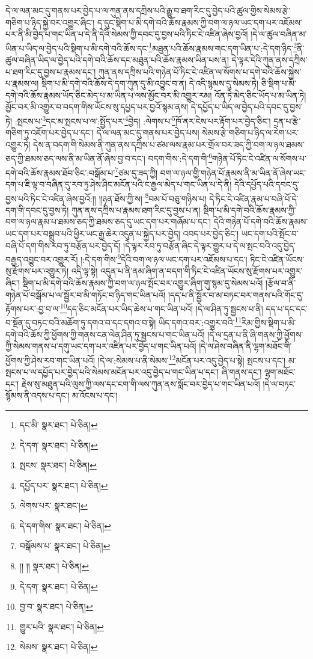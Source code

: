 དེ་ལ་ལན་མང་དུ་གནས་པར་བྱེད་པ་ལ་ཀུན་ནས་དཀྲིས་པའི་རྒྱུ་བ་ཐག་རིང་དུ་བྱེད་པའི་ཚུལ་གྱིས་སེམས་རྩེ་གཅིག་པ་ཉིད་སྐྱེ་བར་འགྱུར་ཞིང་། ད་དུང་སྡིག་པ་མི་དགེ་བའི་ཆོས་རྣམས་ཀྱི་བག་ལ་ཉལ་ཡང་དག་པར་འཇོམས་པར་ནི་མི་བྱེད་པ་གང་ཡིན་པ་དེ་ནི་དེའི་སེམས་ཀྱི་དབང་དུ་བྱས་པའི་ཏིང་ངེ་འཛིན་ཞེས་བྱའོ། །དེ་ལ་ཚུལ་བཞིན་མ་ཡིན་པ་ཡིད་ལ་བྱེད་པའི་སྡིག་པ་མི་དགེ་བའི་ཆོས་དང་\footnote{དང་མི་  སྣར་ཐང་།  པེ་ཅིན། }མཐུན་པའི་ཆོས་རྣམས་གང་དག་ཡིན་པ་:དེ་དག་ཉིད་\footnote{དེ་དག་  སྣར་ཐང་།  པེ་ཅིན། }ནི་ཚུལ་བཞིན་ཡིད་ལ་བྱེད་པའི་དགེ་བའི་ཆོས་དང་མཐུན་པའི་ཆོས་རྣམས་ཡིན་པས་ན། དེ་ལྟར་དེའི་ཀུན་ནས་དཀྲིས་པ་ཐག་རིང་དུ་བྱས་པ་རྣམས་དང་། ཀུན་ནས་དཀྲིས་པའི་གཉེན་པོ་ཏིང་ངེ་འཛིན་ལ་སོགས་པ་དགེ་བའི་ཆོས་སྐྱེས་པ་རྣམས་ལ། སྡིག་པ་མི་དགེ་བའི་ཆོས་དེ་དག་ཀུན་དུ་མི་འབྱུང་བ་ན། དེ་འདི་སྙམས་དུ་སེམས་ཏེ། ཅི་སྡིག་པ་མི་དགེ་བའི་ཆོས་རྣམས་ཡོད་ཅིང་མེད་པ་མ་ཡིན་པ་ལས་མྱོང་བར་མི་འགྱུར་རམ། འོན་ཏེ་མེད་ཅིང་ཡོད་པ་མ་ཡིན་ཏེ། མྱོང་བར་མི་འགྱུར་བ་བདག་གིས་ཡོངས་སུ་དཔྱད་པར་བྱའོ་སྙམ་ནས། དེ་དཔྱོད་པ་ཡིད་ལ་བྱེད་པའི་དབང་དུ་བྱས་ཏེ། :སྤངས་པ་\footnote{སྤངས་  སྣར་ཐང་།  པེ་ཅིན། }དང་མ་སྤངས་པ་ལ་:སྤྱོད་པར་\footnote{དཔྱོད་པར་  སྣར་ཐང་།  པེ་ཅིན། }བྱེད། :ལེགས་པ་\footnote{ལེགས་པར་  སྣར་ཐང་། }ཁོ་ནར་ངེས་པར་རྟོག་པར་བྱེད་ཅིང་། དྲན་པ་རྩེ་གཅིག་ཏུ་འཇོག་པར་བྱེད་པ་དང་། དེ་ལ་ལན་མང་དུ་གནས་པར་བྱེད་པས། སེམས་རྩེ་གཅིག་པ་ཉིད་ལ་རེག་པར་འགྱུར་ཏེ། དེས་ན་བདག་གི་སེམས་ནི་ཀུན་ནས་དཀྲིས་པ་ཙམ་ལས་རྣམ་པར་གྲོལ་བར་ཟད་ཀྱི་བག་ལ་ཉལ་ཐམས་ཅད་ཀྱི་ཐམས་ཅད་ལས་ནི་མ་ཡིན་ནོ་ཞེས་བྱ་བ་དང་། བདག་གིས་:དེ་དག་གི་\footnote{དེ་དག་གིས་  སྣར་ཐང་།  པེ་ཅིན། }གཉེན་པོ་ཏིང་ངེ་འཛིན་ལ་སོགས་པ་དགེ་བའི་ཆོས་རྣམས་ཐོབ་ཅིང་:བསྒོམ་པ་\footnote{བསྒོམས་པ་  སྣར་ཐང་།  པེ་ཅིན། }ཙམ་དུ་ཟད་ཀྱི། བག་ལ་ཉལ་གྱི་གཉེན་པོ་རྣམས་ནི་མ་ཡིན་ནོ་ཞེས་ཡང་དག་པ་ཇི་ལྟ་བ་བཞིན་དུ་རབ་ཏུ་ཤེས་ཤིང་མངོན་པའི་ང་རྒྱལ་མེད་པ་གང་ཡིན་པ་དེ་ནི། དེའི་དཔྱོད་པའི་དབང་དུ་བྱས་པའི་ཏིང་ངེ་འཛིན་ཞེས་བྱའོ:།། །།ཉན་ཐོས་ཀྱི་ས། \footnote{།། །།   སྣར་ཐང་།  པེ་ཅིན། }བམ་པོ་བཅུ་གཉིས་པ། དེ་ཏིང་ངེ་འཛིན་རྣམ་པ་བཞི་པོ་དེ་དག་གི་དབང་དུ་བྱས་ཏེ། ཀུན་ནས་དཀྲིས་པ་རྣམས་ཐག་རིང་དུ་བྱས་པ་ན། སྡིག་པ་མི་དགེ་བའི་ཆོས་རྣམས་ཀྱི་བག་ལ་ཉལ་རྣམ་པ་ཐམས་ཅད་ཀྱི་ཐམས་ཅད་དུ་ཡང་དག་པར་གཞོམ་པ་དང་། དེའི་གཉེན་པོ་དགེ་བའི་ཆོས་རྣམས་ཡང་དག་པར་བསྒྲུབ་པའི་ཕྱིར་ཡང་རྒྱ་ཆེར་འདུན་པ་སྐྱེད་པར་བྱེད། འབད་པར་བྱེད་ཅིང་། ཡང་དག་པའི་སྤོང་བ་བཞི་པོ་དག་གིས་རབ་ཏུ་བརྩོན་པར་བྱེད་དོ། །དེ་ལྟར་རབ་ཏུ་བརྩོན་ཞིང་དེ་ལྟར་གྱུར་པ་དེ་ལ་སྤང་བའི་འདུ་བྱེད་བརྒྱད་འབྱུང་བར་འགྱུར་རོ། །:དེ་དག་གིས་\footnote{དེ་དག་  སྣར་ཐང་།  པེ་ཅིན། }དེའི་བག་ལ་ཉལ་ཡང་དག་པར་འཇོམས་པ་དང་། ཏིང་ངེ་འཛིན་ཡོངས་སུ་རྫོགས་པར་འགྱུར་ཏེ། འདི་ལྟ་སྟེ། འདུན་པ་ནི་ནམ་ཞིག་ན་བདག་གི་ཏིང་ངེ་འཛིན་ཡོངས་སུ་རྫོགས་པར་འགྱུར་ཞིང་། སྡིག་པ་མི་དགེ་བའི་ཆོས་རྣམས་ཀྱི་བག་ལ་ཉལ་སྤོང་བར་འགྱུར་ཞིག་གུ་སྙམ་དུ་སེམས་པའོ། །རྩོལ་བ་ནི་གཉེན་པོ་བསྒོམ་པ་ལ་སྦྱོར་བ་མི་གཏོང་བ་ཉིད་གང་ཡིན་པའོ། །དད་པ་ནི་སྦྱོར་བ་མ་བཏང་བར་གནས་པའི་གོང་དུ་རྟོགས་པར་:བྱ་བ་ལ་\footnote{བྱ་བ་  སྣར་ཐང་།  པེ་ཅིན། }དད་ཅིང་མངོན་པར་ཡིད་ཆེས་པ་གང་ཡིན་པའོ། །དེ་ལ་ཤིན་ཏུ་སྦྱངས་པ་ནི། དད་པ་དང་དང་བ་སྔོན་དུ་བཏང་བའི་མཆོག་ཏུ་དགའ་བ་དང་དགའ་བ་སྟེ། ཡིད་དགའ་བར་:འགྱུར་བའི་\footnote{གྱུར་པའི་  སྣར་ཐང་།  པེ་ཅིན། }རིམ་གྱིས་སྡིག་པ་མི་དགེ་བའི་ཆོས་ཀྱི་ཕྱོགས་ཀྱི་གནས་ངན་ལེན་ཤིན་ཏུ་སྦྱངས་པ་གང་ཡིན་པའོ། །དེ་ལ་དྲན་པ་ནི་ཞི་གནས་ཀྱི་ཕྱོགས་ཀྱི་སེམས་གནས་པ་དགུ་ཡང་དག་པར་འཛིན་པར་བྱེད་པ་གང་ཡིན་པའོ། །དེ་ལ་ཤེས་བཞིན་ནི་ལྷག་མཐོང་གི་ཕྱོགས་ཀྱི་ཤེས་རབ་གང་ཡིན་པའོ། །དེ་ལ་:སེམས་པ་ནི་སེམས་\footnote{སེམས་  སྣར་ཐང་།  པེ་ཅིན། }མངོན་པར་འདུ་བྱེད་པ་སྟེ། སྤངས་པ་དང་། མ་སྤངས་པ་ལ་དཔྱོད་པར་བྱེད་པའི་སེམས་མངོན་པར་འདུ་བྱེད་པ་གང་ཡིན་པ་དང་། ཞི་གནས་དང་། ལྷག་མཐོང་དང་། རྗེས་སུ་མཐུན་པའི་ལུས་ཀྱི་ལས་དང་ངག་གི་ལས་ཀུན་ནས་སློང་བར་བྱེད་པ་གང་ཡིན་པའོ། །དེ་ལ་བཏང་སྙོམས་ནི་འདས་པ་དང་། མ་འོངས་པ་དང་། 